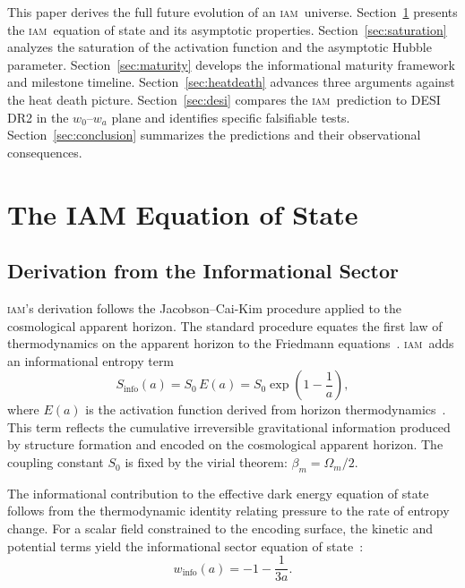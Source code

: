 \documentclass[12pt,letterpaper]{article}
\newcommand{\IAM}{\textsc{iam}}
\newcommand{\Ea}{E(a)}
\newcommand{\winfo}{w_{\mathrm{info}}(a)}
\begin{document}
This paper derives the full future evolution of an \IAM\ universe. Section~\ref{sec:eos} presents the \IAM\ equation of state and its asymptotic properties. Section~\ref{sec:saturation} analyzes the saturation of the activation function and the asymptotic Hubble parameter. Section~\ref{sec:maturity} develops the informational maturity framework and milestone timeline. Section~\ref{sec:heatdeath} advances three arguments against the heat death picture. Section~\ref{sec:desi} compares the \IAM\ prediction to DESI DR2 in the $w_0$--$w_a$ plane and identifies specific falsifiable tests. Section~\ref{sec:conclusion} summarizes the predictions and their observational consequences.

\section{The IAM Equation of State}
\label{sec:eos}

\subsection{Derivation from the Informational Sector}

\IAM's derivation follows the Jacobson--Cai-Kim procedure applied to the cosmological apparent horizon. The standard procedure equates the first law of thermodynamics on the apparent horizon to the Friedmann equations~\citep{CaiKim2005}. \IAM\ adds an informational entropy term
\begin{equation}
    S_{\mathrm{info}}(a) = S_0 \, \Ea = S_0 \exp\!\left(1 - \frac{1}{a}\right),
    \label{eq:Sinfo}
\end{equation}
where $\Ea$ is the activation function derived from horizon thermodynamics~\citep{Mahaffey2026_theory}. This term reflects the cumulative irreversible gravitational information produced by structure formation and encoded on the cosmological apparent horizon. The coupling constant $S_0$ is fixed by the virial theorem: $\beta_m = \Omega_m/2$.

The informational contribution to the effective dark energy equation of state follows from the thermodynamic identity relating pressure to the rate of entropy change. For a scalar field constrained to the encoding surface, the kinetic and potential terms yield the informational sector equation of state~\citep{Mahaffey2026_theory}:
\begin{equation}
    \boxed{\winfo = -1 - \frac{1}{3a}.}
    \label{eq:winfo}
\end{equation}
\end{document}
